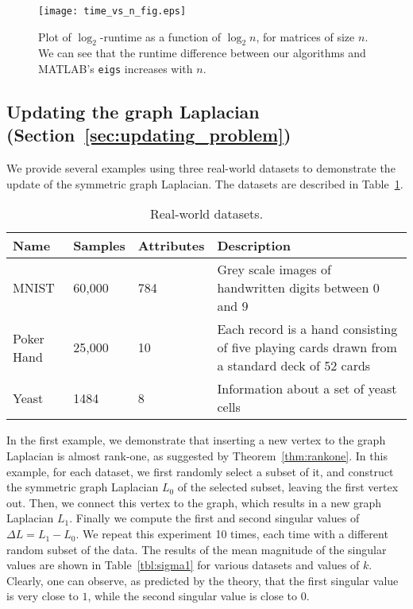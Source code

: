 \documentclass[11pt]{article}
\begin{document}
\begin{figure}
    \centering
    \texttt{[image: time\_vs\_n\_fig.eps]}
    \caption{Plot of $\log_2$-runtime as a function of $\log_2n$, for matrices of size $n$. We can see that the runtime difference between our algorithms and MATLAB's \texttt{eigs} increases with $n$.}
\label{fig:runtime_n}
\end{figure}

\subsection{Updating the graph Laplacian (Section~\ref{sec:updating_problem})}
	
We provide several examples using three real-world datasets to demonstrate the update of the symmetric graph Laplacian. The datasets are described in Table~\ref{tbl:datasets}.

\begin{table}
		\begin{center}
    	\begin{tabular}  { | l | l | l | p{7cm} |}
    	\hline
    	Name & Samples & Attributes & Description \\ \hline
    	MNIST & 60,000 & 784 & Grey scale images of handwritten digits between $0$ and $9$ \\ \hline
    	Poker Hand & 25,000 & 10 & Each record is a hand consisting of five playing cards drawn from a standard deck of 52 cards\\ \hline
    	Yeast & 1484 & 8 &  Information about a set of yeast cells \\ \hline
    	\end{tabular} \end{center} \caption{Real-world datasets.}
    \label{tbl:datasets}
	\end{table}
	
In the first example, we demonstrate that inserting a new vertex to the graph Laplacian is almost rank-one, as suggested by Theorem~\ref{thm:rankone}. In this example, for each dataset, we first randomly select a subset of it, and construct the symmetric graph Laplacian $L_0$ of the selected subset, leaving the first vertex out. Then, we connect this vertex to the graph, which results in a new graph Laplacian $L_1$. Finally we compute the first and second singular values of $\Delta L = L_1 - L_0$. We repeat this experiment 10 times, each time with a different random subset of the data. The results of the mean magnitude of the singular values are shown in Table~\ref{tbl:sigma1} for various datasets and values of $k$. Clearly, one can observe, as predicted by the theory, that the first singular value is very close to $1$, while the second singular value is close to $0$.
\end{document}
